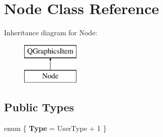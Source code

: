 \hypertarget{class_node}{}\section{Node Class Reference}
\label{class_node}
Inheritance diagram for Node\+:\begin{figure}[H]
\begin{center}
\leavevmode
\includegraphics[height=2.000000cm]{class_node}
\end{center}
\end{figure}
\subsection*{Public Types}
\begin{DoxyCompactItemize}
\item 
\mbox{\label{class_node_ae716c5198bdf4b0a810324756b0f8f11}} 
enum \{ {\bfseries Type} = User\+Type + 1
 \}
\end{DoxyCompactItemize}
